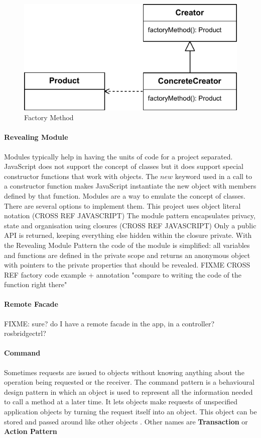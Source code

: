 \begin{figure}[htb]
    \centering
    \includegraphics{figures/design-patterns-factory.pdf}
    \caption{Factory Method}
    \label{fig:design-patterns-factory0}
\end{figure}


\paragraph{Revealing Module} \cite{Osmani:2012} Modules typically help in having the units of code for a project separated.
JavaScript does not support the concept of classes but it does support special constructor functions that work with objects. 
The $new$ keyword used in a call to a constructor function makes JavaScript instantiate the new object with members defined by that function.
Modules are a way to emulate the concept of classes.
There are several options to implement them. 
This project uses object literal notation (CROSS REF JAVASCRIPT)
The module pattern encapsulates privacy, state and organisation using closures (CROSS REF JAVASCRIPT)
Only a public \ac{API} is returned, keeping everything else hidden within the closure private.
With the Revealing Module Pattern the code of the module is simplified: all variables and functions are defined in the private scope and returns an anonymous object with pointers to the private properties that should be revealed.
FIXME CROSS REF factory code example  + annotation "compare to writing the code of the function right there"

\paragraph{Remote Facade} FIXME: sure? do I have a remote facade in the app, in a controller? rosbridgectrl?

\paragraph{Command} 
Sometimes requests are issued to objects without knowing anything about the operation being requested or the receiver.
The command pattern is a behavioural design pattern in which an object is used to represent all the information needed to call a method at a later time. 
It lets objects make requests of unspecified application objects by turning the request itself into an object.
This object can be stored and passed around like other objects \cite{GoF:1995}.
Other names are \textbf{Transaction} or \textbf{Action Pattern}  

